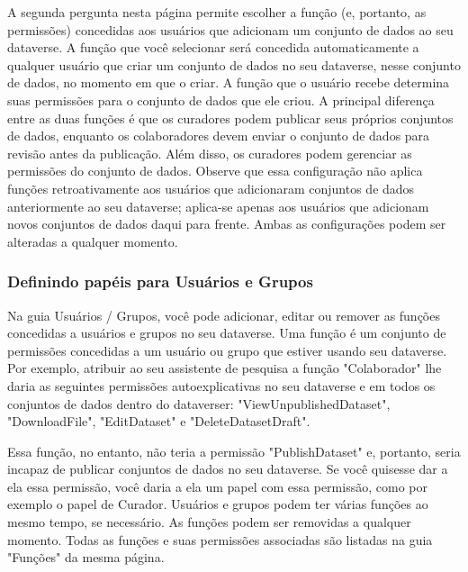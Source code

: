 \documentclass[12pt,hidelinks]{article}
\begin{document}
A segunda pergunta nesta página permite escolher a função (e, portanto, as permissões) concedidas aos usuários que adicionam um conjunto de dados ao seu dataverse. A função que você selecionar será concedida automaticamente a qualquer usuário que criar um conjunto de dados no seu dataverse, nesse conjunto de dados, no momento em que o criar. A função que o usuário recebe determina suas permissões para o conjunto de dados que ele criou. A principal diferença entre as duas funções é que os curadores podem publicar seus próprios conjuntos de dados, enquanto os colaboradores devem enviar o conjunto de dados para revisão antes da publicação. Além disso, os curadores podem gerenciar as permissões do conjunto de dados. Observe que essa configuração não aplica funções retroativamente aos usuários que adicionaram conjuntos de dados anteriormente ao seu dataverse; aplica-se apenas aos usuários que adicionam novos conjuntos de dados daqui para frente. Ambas as configurações podem ser alteradas a qualquer momento.
        
        \subsubsection{Definindo papéis para Usuários e Grupos}
        
\qquad Na guia Usuários / Grupos, você pode adicionar, editar ou remover as funções concedidas a usuários e grupos no seu dataverse. Uma função é um conjunto de \\permissões concedidas a um usuário ou grupo que estiver usando seu dataverse. Por exemplo, atribuir ao seu assistente de pesquisa a função "Colaborador" lhe daria as seguintes permissões autoexplicativas no seu dataverse e em todos os conjuntos de dados dentro do dataverser: "ViewUnpublishedDataset", "DownloadFile", "EditDataset" e "DeleteDatasetDraft". 

Essa função, no entanto, não teria a permissão "PublishDataset" e, portanto, seria incapaz de publicar conjuntos de dados no seu dataverse. Se você quisesse dar a ela essa permissão, você daria a ela um papel com essa permissão, como por exemplo o papel de Curador. Usuários e grupos podem ter várias funções ao mesmo tempo, se necessário. As funções podem ser removidas a qualquer momento. Todas as funções e suas permissões associadas são listadas na guia "Funções" da mesma página.
        
\end{document}
